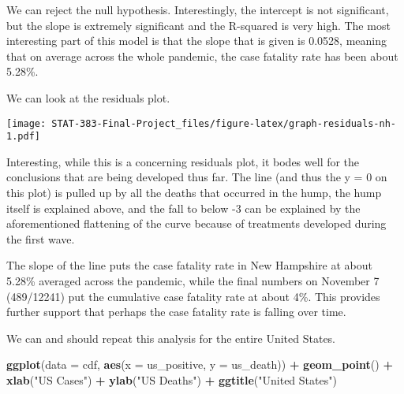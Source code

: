 \documentclass[
]{article}
\newenvironment{Shaded}{\begin{snugshade}}{\end{snugshade}}
\newcommand{\DataTypeTok}[1]{\textcolor[rgb]{0.13,0.29,0.53}{#1}}
\newcommand{\DecValTok}[1]{\textcolor[rgb]{0.00,0.00,0.81}{#1}}
\newcommand{\KeywordTok}[1]{\textcolor[rgb]{0.13,0.29,0.53}{\textbf{#1}}}
\newcommand{\NormalTok}[1]{#1}
\newcommand{\OperatorTok}[1]{\textcolor[rgb]{0.81,0.36,0.00}{\textbf{#1}}}
\newcommand{\StringTok}[1]{\textcolor[rgb]{0.31,0.60,0.02}{#1}}
\begin{document}
We can reject the null hypothesis. Interestingly, the intercept is not
significant, but the slope is extremely significant and the R-squared is
very high. The most interesting part of this model is that the slope
that is given is 0.0528, meaning that on average across the whole
pandemic, the case fatality rate has been about 5.28\%.

We can look at the residuals plot.

\begin{Shaded}
\end{Shaded}

\texttt{[image: STAT-383-Final-Project\_files/figure-latex/graph-residuals-nh-1.pdf]}

Interesting, while this is a concerning residuals plot, it bodes well
for the conclusions that are being developed thus far. The line (and
thus the y = 0 on this plot) is pulled up by all the deaths that
occurred in the hump, the hump itself is explained above, and the fall
to below -3 can be explained by the aforementioned flattening of the
curve because of treatments developed during the first wave.

The slope of the line puts the case fatality rate in New Hampshire at
about 5.28\% averaged across the pandemic, while the final numbers on
November 7 (489/12241) put the cumulative case fatality rate at about
4\%. This provides further support that perhaps the case fatality rate
is falling over time.

We can and should repeat this analysis for the entire United States.

\begin{Shaded}
\begin{Highlighting}[]
\KeywordTok{ggplot}\NormalTok{(}\DataTypeTok{data =}\NormalTok{ cdf, }\KeywordTok{aes}\NormalTok{(}\DataTypeTok{x =}\NormalTok{ us_positive, }\DataTypeTok{y =}\NormalTok{ us_death)) }\OperatorTok{+}\StringTok{ }\KeywordTok{geom_point}\NormalTok{() }\OperatorTok{+}\StringTok{ }\KeywordTok{xlab}\NormalTok{(}\StringTok{"US Cases"}\NormalTok{) }\OperatorTok{+}\StringTok{ }\KeywordTok{ylab}\NormalTok{(}\StringTok{"US Deaths"}\NormalTok{) }\OperatorTok{+}\StringTok{ }\KeywordTok{ggtitle}\NormalTok{(}\StringTok{"United States"}\NormalTok{)}
\end{Highlighting}
\end{Shaded}
\end{document}
